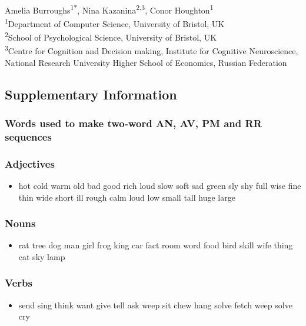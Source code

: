 \documentclass[10pt,letterpaper]{article}
\begin{document}
\begin{flushleft}
{\Large
\textbf{} 
}
\newline
\\
Amelia Burroughs\textsuperscript{1*},
Nina Kazanina\textsuperscript{2,3},
Conor Houghton\textsuperscript{1}
\\
\bigskip
\textsuperscript{1}Department of Computer Science, University of Bristol, UK\\
\textsuperscript{2}School of Psychological Science, University of Bristol, UK\\
\textsuperscript{3}Centre for Cognition and Decision making, Institute for Cognitive Neuroscience, National Research University Higher School of Economics, Russian Federation
\pagebreak{}


\subsection*{Supplementary Information}


\subsubsection*{Words used to make two-word AN, AV, PM and RR sequences}

\subsubsection{Adjectives}
\begin{itemize}
  \item hot
cold
warm
old
bad
good
rich
loud
slow
soft
sad
green
sly
shy
full
wise
fine
thin
wide
short
ill
rough
calm
loud
low
small
tall
huge
large
\end{itemize}

\subsubsection{Nouns}
\begin{itemize}
  \item rat
tree
dog
man
girl
frog
king
car
fact
room
word
food
bird
skill
wife
thing
cat
sky
lamp
\end{itemize}

\subsubsection{Verbs}
\begin{itemize}
  \item send
sing
think
want
give
tell
ask
weep
sit
chew
hang
solve
fetch
weep
solve
cry
\end{itemize}


\end{flushleft}
\end{document}
